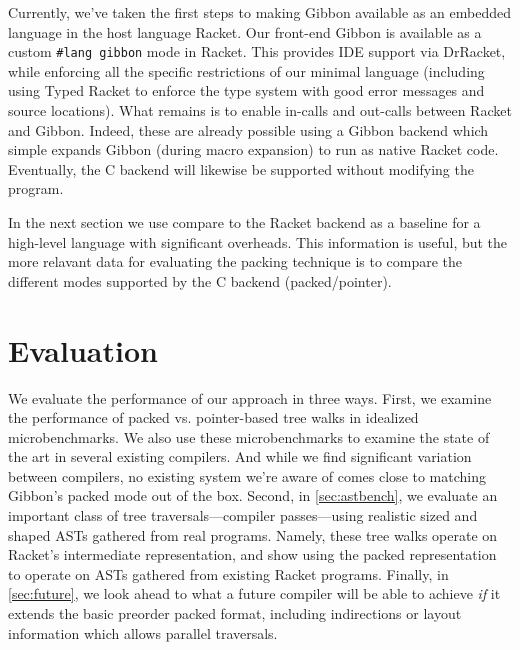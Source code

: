 \documentclass[a4paper,english]{lipics-v2016}
\newcommand{\treelang}{Gibbon\xspace} %
\begin{document}
Currently, we've taken the first steps to making \treelang available as an
embedded language in the host language Racket.
%
Our front-end \treelang is available as a custom \verb|#lang gibbon| mode in
Racket.  This provides IDE support via DrRacket, while enforcing all the
specific restrictions of our minimal language (including using Typed Racket to
enforce the type system with good error messages and source locations).
%
What remains is to enable in-calls and out-calls between Racket and Gibbon.
%
Indeed, these are already possible using a Gibbon backend which simple expands
Gibbon (during macro expansion) to run as native Racket code.  Eventually, the C
backend will likewise be supported without modifying the program.
%

In the next section we use compare to the Racket backend as a baseline for a
high-level language with significant overheads.  This information is useful, but
the more relavant data for evaluating the packing technique is to compare the
different modes supported by the C backend (packed/pointer).


\section{Evaluation}\label{sec:eval}

We evaluate the performance of our approach in three ways. First, we examine the
performance of packed vs. pointer-based tree walks in idealized microbenchmarks.
We also use these microbenchmarks to examine the state of the art in several
existing compilers.  And while we find significant variation between compilers,
no existing system we're aware of comes close to matching \treelang's packed
mode out of the box.
%
%
Second, in \cref{sec:astbench}, we evaluate an important class of tree
traversals---compiler passes---using realistic sized and shaped ASTs gathered from
real programs.
%
Namely, these tree walks operate on Racket's intermediate representation, and
show  using the packed representation to operate on
ASTs gathered from existing Racket programs.
% 
%
Finally, in \cref{sec:future}, we look ahead to what a future compiler
will be able to achieve {\em if} it extends the basic preorder packed format,
including indirections or layout information which allows parallel traversals.
\end{document}
